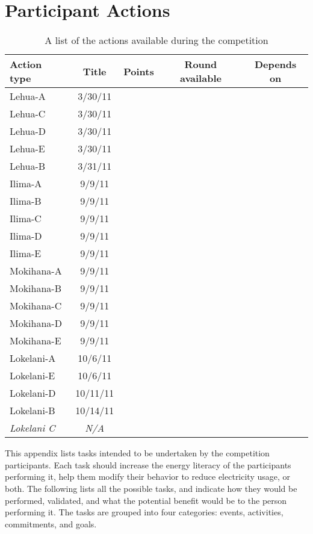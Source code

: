 \chapter{Participant Actions}
\label{app:actions}


\begin{table}[htbp]
	\centering
		\begin{tabular}{| l | c | c | c | c |}
			\hline
			Action type & Title & Points & Round available & Depends on \tabularnewline \hline \hline
			Lehua-A & 3/30/11 \\
			Lehua-C & 3/30/11 \\
			Lehua-D & 3/30/11 \\
			Lehua-E & 3/30/11 \\
			Lehua-B & 3/31/11 \\
			Ilima-A & 9/9/11 \\
			Ilima-B & 9/9/11 \\
			Ilima-C & 9/9/11 \\
			Ilima-D & 9/9/11 \\
			Ilima-E & 9/9/11 \\
			Mokihana-A & 9/9/11 \\
			Mokihana-B & 9/9/11 \\
			Mokihana-C & 9/9/11 \\
			Mokihana-D & 9/9/11 \\
			Mokihana-E & 9/9/11 \\
			Lokelani-A & 10/6/11 \\
			Lokelani-E & 10/6/11 \\
			Lokelani-D & 10/11/11 \\
			Lokelani-B & 10/14/11 \\
			\emph{Lokelani C} & \emph{N/A} \\ \hline
		\end{tabular}
	\caption{A list of the actions available during the competition}
\label{tab:action-list}
\end{table}

This appendix lists tasks intended to be undertaken by the competition participants. Each task should increase the energy literacy of the participants performing it, help them modify their behavior to reduce electricity usage, or both. The following lists all the possible tasks, and indicate how they would be performed, validated, and what the potential benefit would be to the person performing it. The tasks are grouped into four categories: events, activities, commitments, and goals.

